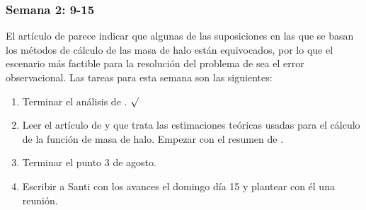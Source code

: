 \subsubsection*{Semana 2: 9-15}
El artículo de \cite{wang2019dominant} parece indicar que algunas de las suposiciones en las que se basan los métodos de cálculo de las masa de halo están equivocados, por lo que el escenario más factible para la resolución del problema de \cite{steinhardt2016impossibly} sea el error observacional. Las tareas para esta semana son las siguientes:
\begin{enumerate}
\item Terminar el análisis de \cite{steinhardt2016impossibly}. $\surd$
\item Leer el artículo de \cite{sheth2001ellipsoidal} y \cite{murray2013hmfcalc} que trata las estimaciones teóricas usadas para el cálculo de la función de masa de halo. Empezar con el resumen de \cite{sheth2001ellipsoidal}.
\item Terminar el punto 3 de agosto.
\item Escribir a Santi con los avances el domingo día 15 y plantear con él una reunión.
\end{enumerate}

